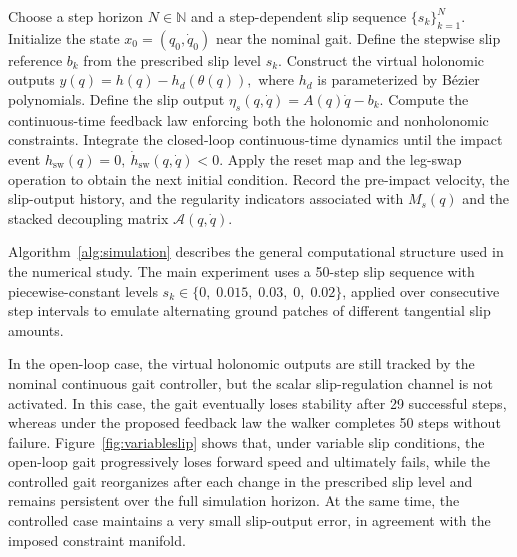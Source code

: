 \documentclass[letterpaper, 10 pt, conference]{ieeeconf}
\begin{document}
{\begin{algorithm}[h!]
\caption{Hybrid simulation with virtual holonomic and nonholonomic constraints}
\label{alg:simulation}
\begin{algorithmic}[1]
\State Choose a step horizon $N\in\mathbb{N}$ and a step-dependent slip sequence $\{s_k\}_{k=1}^N$.
\State Initialize the state $x_0=(q_0,\dot q_0)$ near the nominal gait.
    \State Define the stepwise slip reference $b_k$ from the prescribed slip level $s_k$.
    \State Construct the virtual holonomic outputs
    $
    y(q)=h(q)-h_d(\theta(q)),
    $
    where $h_d$ is parameterized by B\'ezier polynomials.
    \State Define the slip output
    $
    \eta_s(q,\dot q)=A(q)\dot q-b_k.
    $
    \State Compute the continuous-time feedback law enforcing both the holonomic and nonholonomic constraints.
    \State Integrate the closed-loop continuous-time dynamics until the impact event
    $
    h_{\mathrm{sw}}(q)=0,\ \dot h_{\mathrm{sw}}(q,\dot q)<0.
    $
    \State Apply the reset map and the leg-swap operation to obtain the next initial condition.
    \State Record the pre-impact velocity, the slip-output history, and the regularity indicators associated with
    $
    M_s(q)
    $
    and the stacked decoupling matrix
    $
    \mathcal A(q,\dot q).
    $
\EndFor
\end{algorithmic}
\end{algorithm}

Algorithm~\ref{alg:simulation} describes the general computational structure used in the numerical study. 
The main experiment uses a 50-step slip sequence with piecewise-constant levels $s_k \in \{0,\;0.015,\;0.03,\;0,\;0.02\}$, applied over consecutive step intervals to emulate alternating ground patches of different tangential slip amounts. %

In the open-loop case, the virtual holonomic outputs are still tracked by the nominal continuous gait controller, but the scalar slip-regulation channel is not activated. In this case, the gait eventually loses stability after 29 successful steps, whereas under the proposed feedback law the walker completes 50 steps without failure. Figure~\ref{fig:variableslip} shows that, under variable slip conditions, the open-loop gait progressively loses forward speed and ultimately fails, while the controlled gait reorganizes after each change in the prescribed slip level and remains persistent over the full simulation horizon. At the same time, the controlled case maintains a very small slip-output error, in agreement with the imposed constraint manifold.

}
\end{document}
